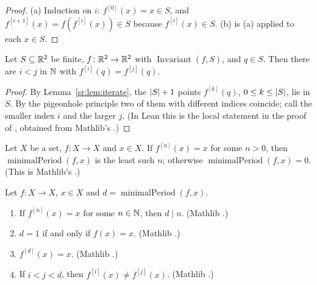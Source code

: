 \begin{proof}
(a) Induction on $i$: $f^{[0]}(x)=x\in S$, and $f^{[i+1]}(x)=f(f^{[i]}(x))\in S$ because $f^{[i]}(x)\in S$. (b) is (a)
applied to each $x\in S$.
\end{proof}

\begin{lemma}\label{sr:lem:pigeon}
Let $S\subseteq\mathbb R^2$ be finite, $f\colon\mathbb R^2\to\mathbb R^2$ with $\operatorname{Invariant}(f,S)$, and $q\in S$. Then there are
$i<j$ in $\mathbb N$ with $f^{[i]}(q)=f^{[j]}(q)$.
\end{lemma}

\begin{proof}
By Lemma~\ref{sr:lem:iterate}, the $\lvert S\rvert+1$ points $f^{[k]}(q)$, $0\le k\le\lvert S\rvert$, lie in $S$. By the pigeonhole
principle two of them with different indices coincide; call the smaller index $i$ and the larger $j$. (In Lean this is
the local statement  in the proof of , obtained from Mathlib's
.)
\end{proof}

\begin{definition}\label{sr:def:minper}
Let $X$ be a set, $f\colon X\to X$ and $x\in X$. If $f^{[n]}(x)=x$ for some $n>0$, then $\operatorname{minimalPeriod}(f,x)$
is the least such $n$; otherwise $\operatorname{minimalPeriod}(f,x)=0$. (This is Mathlib's
.)
\end{definition}

\begin{lemma}\label{sr:lem:minper}
Let $f\colon X\to X$, $x\in X$ and $d=\operatorname{minimalPeriod}(f,x)$.
\begin{enumerate}[label=(MP\arabic*)]
\item If $f^{[n]}(x)=x$ for some $n\in\mathbb N$, then $d\mid n$. (Mathlib .)
\item $d=1$ if and only if $f(x)=x$. (Mathlib .)
\item $f^{[d]}(x)=x$. (Mathlib .)
\item If $i<j<d$, then $f^{[i]}(x)\ne f^{[j]}(x)$. (Mathlib .)
\end{enumerate}
\end{lemma}

